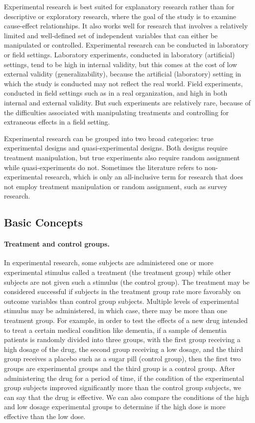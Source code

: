 Experimental research is best suited for explanatory research rather than for descriptive or exploratory research, where the goal of the study is to examine cause-effect relationships. It also works well for research that involves a relatively limited and well-defined set of independent variables that can either be manipulated or controlled. Experimental research can be conducted in laboratory or field settings. Laboratory experiments, conducted in laboratory (artificial) settings, tend to be high in internal validity, but this comes at the cost of low external validity (generalizability), because the artificial (laboratory) setting in which the study is conducted may not reflect the real world. Field experiments, conducted in field settings such as in a real organization, and high in both internal and external validity. But such experiments are relatively rare, because of the difficulties associated with manipulating treatments and controlling for extraneous effects in a field setting.

Experimental research can be grouped into two broad categories: true experimental designs and quasi-experimental designs. Both designs require treatment manipulation, but true experiments also require random assignment while quasi-experiments do not. Sometimes the literature refers to non-experimental research, which is only an all-inclusive term for research that does not employ treatment manipulation or random assignment, such as survey research.

\subsection{Basic Concepts}

\paragraph{Treatment and control groups.} In experimental research, some subjects are administered one or more experimental stimulus called a treatment (the treatment group) while other subjects are not given such a stimulus (the control group). The treatment may be considered successful if subjects in the treatment group rate more favorably on outcome variables than control group subjects. Multiple levels of experimental stimulus may be administered, in which case, there may be more than one treatment group. For example, in order to test the effects of a new drug intended to treat a certain medical condition like dementia, if a sample of dementia patients is randomly divided into three groups, with the first group receiving a high dosage of the drug, the second group receiving a low dosage, and the third group receives a placebo such as a sugar pill (control group), then the first two groups are experimental groups and the third group is a control group. After administering the drug for a period of time, if the condition of the experimental group subjects improved significantly more than the control group subjects, we can say that the drug is effective. We can also compare the conditions of the high and low dosage experimental groups to determine if the high dose is more effective than the low dose.

